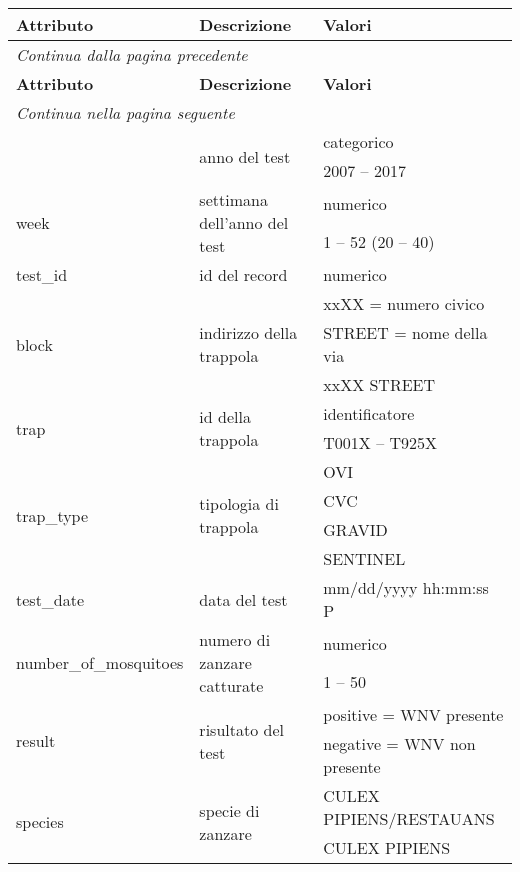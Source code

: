 \begin{longtable}{lll}
	\toprule
	\textbf{Attributo} \quad & \textbf{Descrizione} & \textbf{Valori} \\
	\midrule
	\endfirsthead
	\multicolumn{3}{l}{\footnotesize\itshape Continua dalla pagina precedente} \\
	\toprule
	\textbf{Attributo} \quad & \textbf{Descrizione} & \textbf{Valori} \\			
	\endhead
	\multicolumn{3}{l}{\footnotesize\itshape Continua nella pagina 
		seguente} \\
	\endfoot
	\endlastfoot
	
	\multirow{2}{*}{season\_year} & \multirow{2}{*}{anno del test} &  categorico \\
	& &{2007} -- {2017}       	\\ \hline
	\multirow{2}{*}{week}					&\multirow{2}{*}{settimana dell'anno del test}  & numerico    \\ 
	& & {1} -- {52} ({20} -- {40})\\\hline
	test\_id			& id del record &  numerico        	\\\hline 
	\multirow{3}{*}{block}	& \multirow{3}{*}{indirizzo della trappola} & xxXX 
	= numero civico \\
	& & STREET = nome della via	\\
	& & xxXX STREET \\ \hline
	\multirow{2}{*}{trap}	&\multirow{2}{*}{id della trappola} &  
	identificatore        	\\ 
	&& T001X -- T925X\\\hline
	\multirow{4}{*}{trap\_type}				& \multirow{4}{*}{tipologia di trappola} &     OVI\\
	&& CVC\\
	&& GRAVID\\
	&& SENTINEL\\\hline
	{test\_date}	&{data del test}   &   mm/dd/yyyy hh:mm:ss P \\\hline
	\multirow{2}{*}{number\_of\_mosquitoes}	& \multirow{2}{*}{numero di zanzare catturate} &  numerico        	\\ 
	& & {1} -- {50} \\ \hline
	\multirow{2}{*}{result}	& \multirow{2}{*}{risultato del test}   &  positive = WNV presente \\
	& & negative = WNV non presente  	\\ \hline
	\multirow{8}{*}{species}	& \multirow{8}{*}{specie di zanzare}	 & CULEX PIPIENS/RESTAUANS \\
	& & CULEX PIPIENS \\

\end{longtable}
